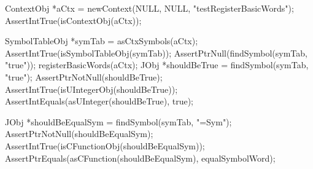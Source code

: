 \startCTest
  ContextObj *aCtx = newContext(NULL, NULL, "testRegisterBasicWords");
  AssertIntTrue(isContextObj(aCtx));
  
  SymbolTableObj *symTab = asCtxSymbols(aCtx);
  AssertIntTrue(isSymbolTableObj(symTab));
  AssertPtrNull(findSymbol(symTab, "true"));
  registerBasicWords(aCtx);
  JObj *shouldBeTrue = findSymbol(symTab, "true");
  AssertPtrNotNull(shouldBeTrue);
  AssertIntTrue(isUIntegerObj(shouldBeTrue));
  AssertIntEquals(asUInteger(shouldBeTrue), true);
  
  JObj *shouldBeEqualSym = findSymbol(symTab, "=Sym");
  AssertPtrNotNull(shouldBeEqualSym);
  AssertIntTrue(isCFunctionObj(shouldBeEqualSym));
  AssertPtrEquals(asCFunction(shouldBeEqualSym), equalSymbolWord);
\stopCTest

\stopTestCase
\stopTestSuite